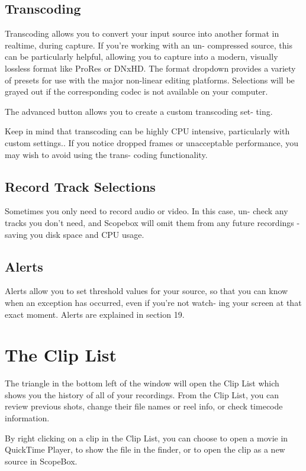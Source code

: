 \documentclass[10,letterpaper,]{report}
\begin{document}
\subsection{Transcoding}

Transcoding allows you to convert your input source into another format
in realtime, during capture. If you're working with an un- compressed
source, this can be particularly helpful, allowing you to capture into a
modern, visually lossless format like ProRes or DNxHD. The format
dropdown provides a variety of presets for use with the major non-linear
editing platforms. Selections will be grayed out if the corresponding
codec is not available on your computer.

The advanced button allows you to create a custom transcoding set- ting.

Keep in mind that transcoding can be highly CPU intensive, particularly
with custom settings.. If you notice dropped frames or unacceptable
performance, you may wish to avoid using the trans- coding
functionality.

\subsection{Record Track Selections}

Sometimes you only need to record audio or video. In this case, un-
check any tracks you don't need, and Scopebox will omit them from any
future recordings - saving you disk space and CPU usage.

\subsection{Alerts}

Alerts allow you to set threshold values for your source, so that you
can know when an exception has occurred, even if you're not watch- ing
your screen at that exact moment. Alerts are explained in section 19.

\section{The Clip List}

The triangle in the bottom left of the window will open the Clip List
which shows you the history of all of your recordings. From the Clip
List, you can review previous shots, change their file names or reel
info, or check timecode information.

By right clicking on a clip in the Clip List, you can choose to open a
movie in QuickTime Player, to show the file in the finder, or to open
the clip as a new source in ScopeBox.
\end{document}
